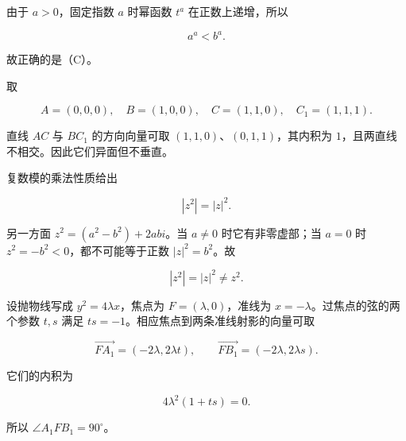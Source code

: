\begin{answer}

由于 $a>0$，固定指数 $a$ 时幂函数 $t^a$ 在正数上递增，所以

\nopagebreak[4]
\[
a^a<b^a.
\]

故正确的是（C）。


取

\nopagebreak[4]
\[
A=(0,0,0),\quad B=(1,0,0),\quad C=(1,1,0),\quad C_1=(1,1,1).
\]

直线 $AC$ 与 $BC_1$ 的方向向量可取 $(1,1,0)$、$(0,1,1)$，其内积为 $1$，且两直线不相交。因此它们异面但不垂直。


复数模的乘法性质给出

\nopagebreak[4]
\[
|z^2|=|z|^2.
\]

另一方面 $z^2=(a^2-b^2)+2abi$。当 $a\ne0$ 时它有非零虚部；当 $a=0$ 时 $z^2=-b^2<0$，都不可能等于正数 $|z|^2=b^2$。故

\nopagebreak[4]
\[
|z^2|=|z|^2\ne z^2.
\]


设抛物线写成 $y^2=4\lambda x$，焦点为 $F=(\lambda,0)$，准线为 $x=-\lambda$。过焦点的弦的两个参数 $t,s$ 满足 $ts=-1$。相应焦点到两条准线射影的向量可取

\nopagebreak[4]
\[
\overrightarrow{FA_1}=(-2\lambda,2\lambda t),\qquad
\overrightarrow{FB_1}=(-2\lambda,2\lambda s).
\]

它们的内积为

\nopagebreak[4]
\[
4\lambda^2(1+ts)=0.
\]

所以 $\angle A_1FB_1=90^\circ$。





















\end{answer}
